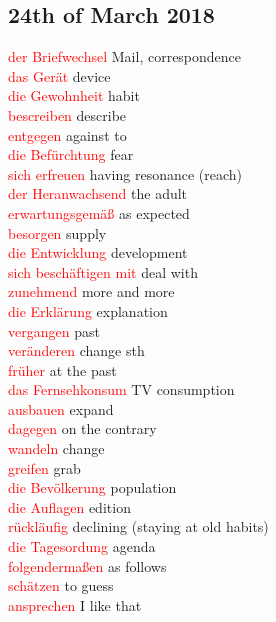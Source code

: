 \documentclass{article}
\begin{document}
\begin{multicols}{2}
	\section*{24th of March 2018}
	\textcolor{red}{der Briefwechsel} Mail, correspondence\\
	\textcolor{red}{das Gerät} device \\
	\textcolor{red}{die Gewohnheit} habit \\
	\textcolor{red}{bescreiben} describe\\
	\textcolor{red}{entgegen} against to \\
	\textcolor{red}{die Befürchtung} fear\\
	\textcolor{red}{sich erfreuen} having resonance (reach) \\
	\textcolor{red}{der Heranwachsend} the adult \\
	\textcolor{red}{erwartungsgemäß} as expected \\
	\textcolor{red}{besorgen} supply \\
	\textcolor{red}{die Entwicklung} development \\
	\textcolor{red}{sich beschäftigen mit} deal with \\
	\textcolor{red}{zunehmend} more and more \\
	\textcolor{red}{die Erklärung} explanation \\
	\textcolor{red}{vergangen} past\\
	\textcolor{red}{veränderen} change sth \\
	\textcolor{red}{früher} at the past \\
	\textcolor{red}{das Fernsehkonsum} TV consumption\\
	\textcolor{red}{ausbauen} expand \\
	\textcolor{red}{dagegen} on the contrary\\
	\textcolor{red}{wandeln} change\\
	\textcolor{red}{greifen} grab\\
	\textcolor{red}{die Bevölkerung} population \\
	\textcolor{red}{die Auflagen} edition\\
	\textcolor{red}{rückläufig} declining (staying at old habits)\\
	\textcolor{red}{die Tagesordung} agenda \\
	\textcolor{red}{folgendermaßen} as follows \\ 
	\textcolor{red}{schätzen} to guess\\
	\textcolor{red}{ansprechen} I like that \\

\end{multicols}
\end{document}
